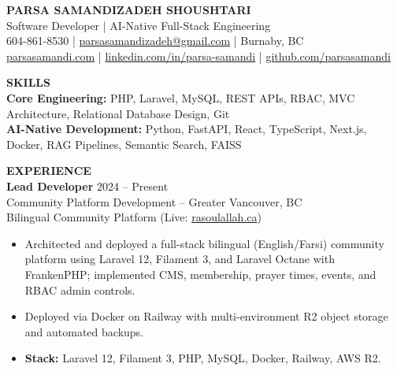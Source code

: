 \documentclass[10pt,letterpaper]{article}
\begin{document}
\begin{center}
    {\Large \textbf{PARSA SAMANDIZADEH SHOUSHTARI}}\\[3pt]
    Software Developer | AI-Native Full-Stack Engineering \\[6pt]
    604-861-8530 | \href{mailto:parsasamandizadeh@gmail.com}{parsasamandizadeh@gmail.com} | Burnaby, BC\\
    \href{https://parsasamandi.com}{parsasamandi.com} | \href{https://www.linkedin.com/in/parsa-samandi/}{linkedin.com/in/parsa-samandi} | \href{https://github.com/parsasamandi}{github.com/parsasamandi}
\end{center}

\vspace{5pt}

\textbf{SKILLS}\\[4pt]

\textbf{Core Engineering:} PHP, Laravel, MySQL, REST APIs, RBAC, MVC Architecture, Relational Database Design, Git\\
\textbf{AI-Native Development:} Python, FastAPI, React, TypeScript, Next.js, Docker, RAG Pipelines, Semantic Search, FAISS

\vspace{8pt}

\textbf{EXPERIENCE}\\[4pt]

\textbf{Lead Developer} \hfill 2024 -- Present\\
Community Platform Development -- Greater Vancouver, BC\\
Bilingual Community Platform (Live: \href{https://www.rasoulallah.ca/}{rasoulallah.ca})
\begin{itemize}
    \item Architected and deployed a full-stack bilingual (English/Farsi) community platform using Laravel 12, Filament 3, and Laravel Octane with FrankenPHP; implemented CMS, membership, prayer times, events, and RBAC admin controls.
    \item Deployed via Docker on Railway with multi-environment R2 object storage and automated backups.
    \item \textbf{Stack:} Laravel 12, Filament 3, PHP, MySQL, Docker, Railway, AWS R2.
\end{itemize}

\vspace{4pt}
\end{document}
